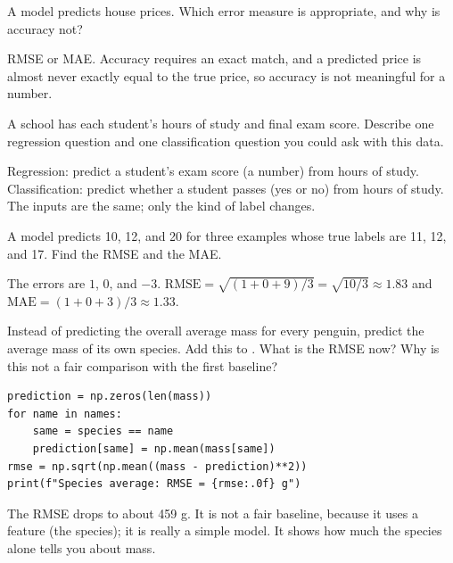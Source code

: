 \begin{Exercise}[label=cr2, title=Choose a measure]
A model predicts house prices. Which error measure is appropriate, and why is accuracy not?
\end{Exercise}
\begin{Answer}[ref=cr2]
RMSE or MAE. Accuracy requires an exact match, and a predicted price is almost never exactly equal to the
true price, so accuracy is not meaningful for a number.
\end{Answer}

\begin{Exercise}[label=cr3, title={Same data, two questions}]
A school has each student's hours of study and final exam score. Describe one regression question and one
classification question you could ask with this data.
\end{Exercise}
\begin{Answer}[ref=cr3]
Regression: predict a student's exam score (a number) from hours of study. Classification: predict whether
a student passes (yes or no) from hours of study. The inputs are the same; only the kind of label changes.
\end{Answer}

\begin{Exercise}[label=cr4, title={RMSE by hand}, space=3cm]
A model predicts 10, 12, and 20 for three examples whose true labels are 11, 12, and 17. Find the RMSE and the
MAE.
\end{Exercise}
\begin{Answer}[ref=cr4]
The errors are $1$, $0$, and $-3$. $\text{RMSE} = \sqrt{(1 + 0 + 9)/3} = \sqrt{10/3} \approx 1.83$ and
$\text{MAE} = (1 + 0 + 3)/3 \approx 1.33$.
\end{Answer}

\begin{Exercise}[label=cr5, title={A smarter baseline}]
Instead of predicting the overall average mass for every penguin, predict the average mass of its own
species. Add this to . What is the RMSE now? Why is this not a fair comparison with
the first baseline?
\end{Exercise}
\begin{Answer}[ref=cr5]
\begin{verbatim}
prediction = np.zeros(len(mass))
for name in names:
    same = species == name
    prediction[same] = np.mean(mass[same])
rmse = np.sqrt(np.mean((mass - prediction)**2))
print(f"Species average: RMSE = {rmse:.0f} g")
\end{verbatim}
The RMSE drops to about 459 g. It is not a fair baseline, because it uses a feature (the species); it is
really a simple model. It shows how much the species alone tells you about mass.
\end{Answer}

